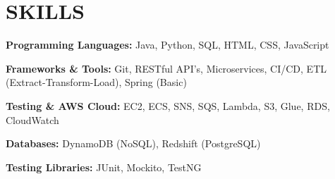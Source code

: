     \section{SKILLS}

        \begin{onecolentry}
            \textbf{Programming Languages:} Java, Python, SQL, HTML, CSS, JavaScript
        \end{onecolentry}

        \vspace{0.1 cm}

        \begin{onecolentry}
            \textbf{Frameworks \& Tools:} Git, RESTful API's, Microservices, CI/CD, ETL \small {(Extract-Transform-Load)}, \small{Spring (Basic)}
        \end{onecolentry}

        \vspace{0.1 cm}

        \begin{onecolentry}
            \textbf{Testing \& AWS Cloud:} EC2, ECS, SNS, SQS, Lambda, S3, Glue, RDS, CloudWatch
        \end{onecolentry}

        \vspace{0.1 cm}

        \begin{onecolentry}
            \textbf{Databases:} DynamoDB \small{(NoSQL)}, Redshift \small{(PostgreSQL)}
        \end{onecolentry}

        \vspace{0.1 cm}
        
        \begin{onecolentry}
            \textbf{Testing Libraries:} JUnit, Mockito, TestNG
        \end{onecolentry}

